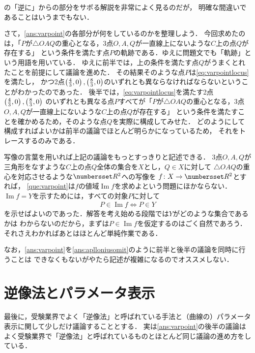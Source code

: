 \documentclass[11pt,a4paper]{ltjsarticle}
\newcommand*{\equivalent}{\Longleftrightarrow}
\newcommand*{\coord}[1]{\paren{#1}}
\DeclareMathOperator{\Image}{Im}
\theoremstyle{definition}
\begin{document}
の「逆に」からの部分をサボる解説を非常によく見るのだが，
明確な間違いであることはいうまでもない．

さて，\cref{ans:varpoint}の各部分が何をしているのかを整理しよう．
今回求めたのは，「$P$が$\triangle OAQ$の重心となる，3点$O,A,Q$が一直線上にないような$C$上の点$Q$が存在する」
という条件を満たす点$P$の軌跡である．ゆえに問題文でも「軌跡」という用語を用いている．
ゆえに前半では，上の条件を満たす点$Q$がうまくとれたことを前提にして議論を進めた．
その結果そのような点$P$は\cref{eq:varpointlocus}を満たし，
かつ2点$\coord{\frac{4}{3}, 0}, \coord{\frac{8}{3}, 0}$のいずれとも異ならなければならないということがわかったのであった．
後半では，\cref{eq:varpointlocus}を満たす2点$\coord{\frac{4}{3}, 0}, \coord{\frac{8}{3}, 0}$
のいずれとも異なる点$P$すべてが「$P$が$\triangle OAQ$の重心となる，3点$O,A,Q$が一直線上にないような$C$上の点$Q$が存在する」
という条件を満たすことを確かめるため，そのような点$Q$を実際に構成してみせた．
どのようにして構成すればよいかは前半の議論でほとんど明らかになっているため，
それをトレースするのみである．

写像の言葉を用いれば上記の議論をもっとすっきりと記述できる．
3点$O,A,Q$が三角形をなすような$C$上の点$Q$全体の集合を$X$とし，$Q \in X$に対して
$\triangle OAQ$の重心を対応させるような$\Real^2$への写像を
$f \colon X \to \Real^2$とすれば，
\cref{que:varpoint}は$f$の値域$\Image f$を求めよという問題にほかならない．
$\Image f = Y$を示すためには，すべての対象$P$に対して
\begin{align}
  P \in \Image f \equivalent P \in Y
  \label{eq:imageiquiv}
\end{align}
を示せばよいのであった．解答を考え始める段階では$Y$がどのような集合であるかは
わからないのだから，まずは$P \in \Image f$を仮定するのはごく自然であろう．
それさえわかればあとはほとんど単純作業である．

なお，\cref{ans:varpoint}を\cref{ans:aplloniusomit}のように前半と後半の議論を同時に行うことは
できなくもないがやたら記述が複雑になるのでオススメしない．



\section{逆像法とパラメータ表示}

最後に，受験業界でよく「逆像法」と呼ばれている手法と（曲線の）パラメータ表示に関して少しだけ議論することとする．
実は\cref{ans:varpoint}の後半の議論は
よく受験業界で「逆像法」と呼ばれているものとほとんど同じ議論の進め方をしている．
\end{document}
